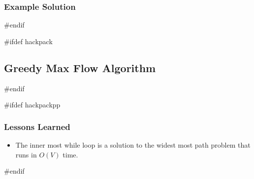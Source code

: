 \subsubsection{Example Solution}
#endif

#ifdef hackpack
\subsection{Greedy Max Flow Algorithm}
#endif

#ifdef hackpackpp
\subsubsection{Lessons Learned}
\begin{itemize}
	\item The inner most while loop is a solution to the widest most path problem that runs in $O(V)$ time.
\end{itemize}
#endif

